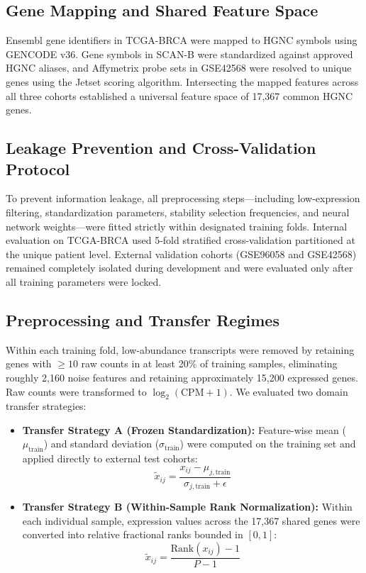 \documentclass[11pt,a4paper]{article}
\begin{document}
\subsection{Gene Mapping and Shared Feature Space}
Ensembl gene identifiers in TCGA-BRCA were mapped to HGNC symbols using GENCODE v36. Gene symbols in SCAN-B were standardized against approved HGNC aliases, and Affymetrix probe sets in GSE42568 were resolved to unique genes using the Jetset scoring algorithm. Intersecting the mapped features across all three cohorts established a universal feature space of 17,367 common HGNC genes.

\subsection{Leakage Prevention and Cross-Validation Protocol}
To prevent information leakage, all preprocessing steps---including low-expression filtering, standardization parameters, stability selection frequencies, and neural network weights---were fitted strictly within designated training folds. Internal evaluation on TCGA-BRCA used 5-fold stratified cross-validation partitioned at the unique patient level. External validation cohorts (GSE96058 and GSE42568) remained completely isolated during development and were evaluated only after all training parameters were locked.

\subsection{Preprocessing and Transfer Regimes}
Within each training fold, low-abundance transcripts were removed by retaining genes with $\ge 10$ raw counts in at least 20\% of training samples, eliminating roughly 2,160 noise features and retaining approximately 15,200 expressed genes. Raw counts were transformed to $\log_2(\text{CPM} + 1)$. We evaluated two domain transfer strategies:
\begin{itemize}
    \item \textbf{Transfer Strategy A (Frozen Standardization):} Feature-wise mean ($\mu_{\text{train}}$) and standard deviation ($\sigma_{\text{train}}$) were computed on the training set and applied directly to external test cohorts:
    \begin{equation}
    \tilde{x}_{ij} = \frac{x_{ij} - \mu_{j,\text{train}}}{\sigma_{j,\text{train}} + \epsilon}
    \end{equation}
    \item \textbf{Transfer Strategy B (Within-Sample Rank Normalization):} Within each individual sample, expression values across the 17,367 shared genes were converted into relative fractional ranks bounded in $[0, 1]$:
    \begin{equation}
    \tilde{x}_{ij} = \frac{\text{Rank}(x_{ij}) - 1}{P - 1}
    \end{equation}
\end{itemize}
\end{document}
